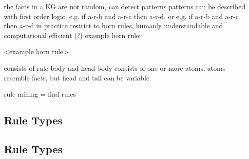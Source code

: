 the facts in a KG are not random, can detect patterns
patterns can be described with first order logic, e.g. if a-r-b and a-r-c then a-r-d, or e.g. if a-r-b and a-r-c then a-r-d
in practice restrict to horn rules, humanly understandable and computational efficient (?)
example horn rule:

<example horn rule>

consists of rule body and head
body consists of one or more atoms.
atoms resemble facts, but head and tail can be variable

rule mining = find rules

\subsection{Rule Types}
\label{subsec:3_basics/2_rules/1_rule_types}


\subsection{Rule Types}
\label{subsec:3_basics/2_rules/2_rule_metrics}

